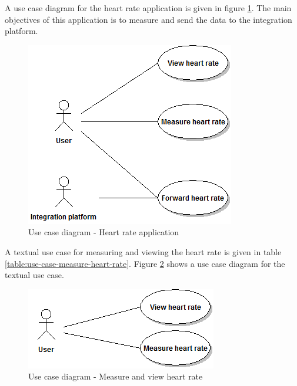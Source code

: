 A use case diagram for the heart rate application is given in figure \ref{figure:use-case-diagram-heart-rate}.
The main objectives of this application is to measure and send the data to the integration platform.

\begin{figure}[H]
\centering
\includegraphics[scale=0.6]{../Figures/use-case-diagram-heart-rate.png}
\caption{Use case diagram - Heart rate application}
\label{figure:use-case-diagram-heart-rate}
\end{figure}

A textual use case for measuring and viewing the heart rate is given in table \ref{table:use-case-measure-heart-rate}.
Figure \ref{figure:use-case-diagram-measure-heart-rate} shows a use case diagram for the textual use case.

\begin{figure}[H]
\centering
\includegraphics[scale=0.75]{../Figures/use-case-diagram-measure-and-view-heart-rate.png}
\caption{Use case diagram - Measure and view heart rate}
\label{figure:use-case-diagram-measure-heart-rate}
\end{figure}

